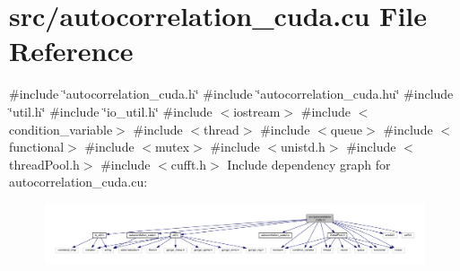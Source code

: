\hypertarget{autocorrelation__cuda_8cu}{}\section{src/autocorrelation\+\_\+cuda.cu File Reference}
\label{autocorrelation__cuda_8cu}
{\ttfamily \#include \char`\"{}autocorrelation\+\_\+cuda.\+h\char`\"{}}\newline
{\ttfamily \#include \char`\"{}autocorrelation\+\_\+cuda.\+hu\char`\"{}}\newline
{\ttfamily \#include \char`\"{}util.\+h\char`\"{}}\newline
{\ttfamily \#include \char`\"{}io\+\_\+util.\+h\char`\"{}}\newline
{\ttfamily \#include $<$iostream$>$}\newline
{\ttfamily \#include $<$condition\+\_\+variable$>$}\newline
{\ttfamily \#include $<$thread$>$}\newline
{\ttfamily \#include $<$queue$>$}\newline
{\ttfamily \#include $<$functional$>$}\newline
{\ttfamily \#include $<$mutex$>$}\newline
{\ttfamily \#include $<$unistd.\+h$>$}\newline
{\ttfamily \#include $<$thread\+Pool.\+h$>$}\newline
{\ttfamily \#include $<$cufft.\+h$>$}\newline
Include dependency graph for autocorrelation\+\_\+cuda.\+cu\+:\nopagebreak
\begin{figure}[H]
\begin{center}
\leavevmode
\includegraphics[width=350pt]{autocorrelation__cuda_8cu__incl}
\end{center}
\end{figure}
